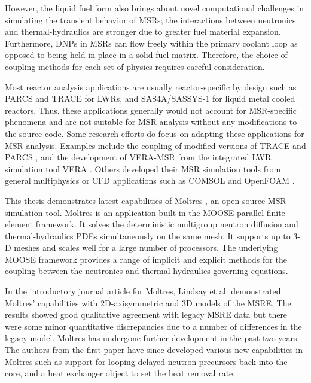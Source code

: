 However, the liquid fuel form also brings about novel computational
challenges in simulating the transient behavior of \glspl{MSR}; the
interactions between neutronics and thermal-hydraulics are stronger due
to greater fuel material expansion. Furthermore, \glspl{DNP} in \glspl{MSR}
can flow freely within the primary coolant
loop as opposed to being held in place in a solid fuel matrix. Therefore,
the choice of coupling methods for each set of physics requires careful
consideration. 

Most reactor analysis applications are usually reactor-specific by
design such as PARCS and TRACE for \glspl{LWR}, and SAS4A/SASSYS-1 for
liquid metal cooled reactors. Thus, these applications generally would not
account for \gls{MSR}-specific phenomena and are not suitable for \gls{MSR}
analysis without any modifications to the source code. Some research efforts
do focus on adapting these applications for \gls{MSR} analysis. Examples
include the coupling of modified versions of TRACE and PARCS
\cite{pettersen_coupled_2016}, and the development of VERA-MSR from the
integrated \gls{LWR} simulation tool VERA \cite{graham_development_2019}.
Others developed their \gls{MSR} simulation tools from general
multiphysics or \gls{CFD} applications such as COMSOL
\cite{fiorina_modelling_2014} and OpenFOAM \cite{aufiero_development_2014}.

This thesis demonstrates latest capabilities of Moltres
\cite{lindsay_introduction_2018}, an open source MSR simulation tool. Moltres
is an application built in the \gls{MOOSE} parallel finite element framework.
It solves
the deterministic multigroup neutron diffusion and thermal-hydraulics
\glspl{PDE} simultaneously on the same mesh. It supports up to 3-D meshes and
scales well for a large number of processors. The underlying \gls{MOOSE}
framework
provides a range of implicit and explicit methods for the coupling between the
neutronics and thermal-hydraulics governing equations.

In the introductory journal article for Moltres, Lindsay et al.
\cite{lindsay_introduction_2018} demonstrated Moltres' capabilities with
2D-axisymmetric and 3D models of the \gls{MSRE}. The results showed good
qualitative agreement with legacy \gls{MSRE} data but there were some minor
quantitative discrepancies due to a number of differences in the legacy model. 
Moltres has undergone further development in the past two years. The authors
from the first paper have since developed various new capabilities in Moltres
such as support for looping delayed neutron precursors back into the core,
and a heat exchanger object to set the heat removal rate. 

